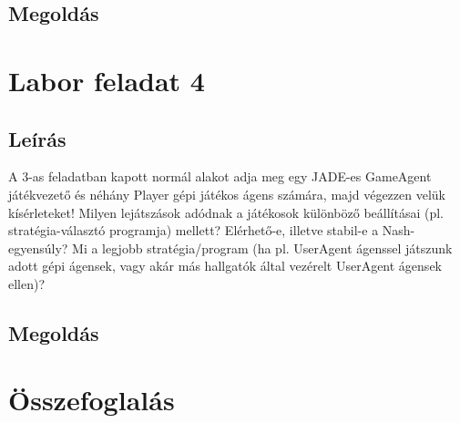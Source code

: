 \subsection{Megoldás}


\section{Labor feladat 4}
\subsection{Leírás}A 3-as feladatban kapott normál alakot adja meg egy JADE-es GameAgent játékvezető és néhány Player gépi játékos ágens számára, majd végezzen velük kísérleteket! Milyen lejátszások adódnak a játékosok különböző beállításai (pl. stratégia-választó programja) mellett? Elérhető-e, illetve stabil-e a Nash-egyensúly? Mi a legjobb stratégia/program (ha pl. UserAgent ágenssel játszunk adott gépi ágensek, vagy akár más hallgatók által vezérelt UserAgent ágensek ellen)?   
\subsection{Megoldás}
\section{Összefoglalás}
